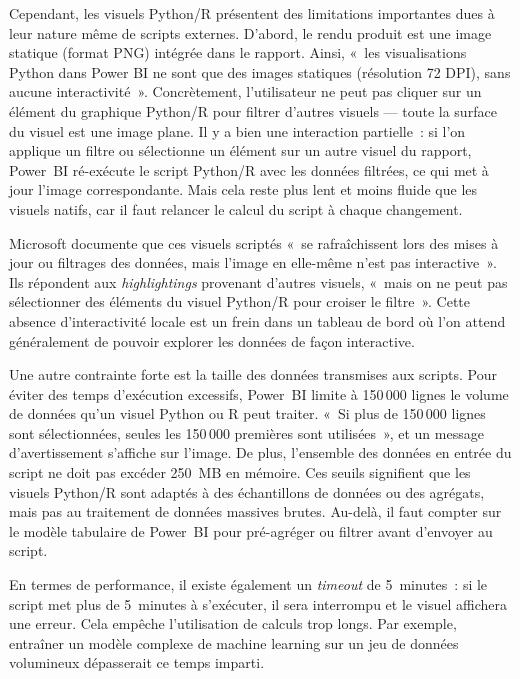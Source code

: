 Cependant, les visuels Python/R présentent des limitations importantes dues à leur nature même de scripts externes.  
D’abord, le rendu produit est une image statique (format PNG) intégrée dans le rapport.  
Ainsi, «~les visualisations Python dans Power BI ne sont que des images statiques (résolution 72 DPI), sans aucune interactivité~»\parencite{RealPythonPowerBI2023}.  
Concrètement, l’utilisateur ne peut pas cliquer sur un élément du graphique Python/R pour filtrer d’autres visuels — toute la surface du visuel est une image plane.  
Il y a bien une interaction partielle~: si l’on applique un filtre ou sélectionne un élément sur un autre visuel du rapport, Power~BI ré-exécute le script Python/R avec les données filtrées, ce qui met à jour l’image correspondante\parencite{RealPythonPowerBI2023}.  
Mais cela reste plus lent et moins fluide que les visuels natifs, car il faut relancer le calcul du script à chaque changement.

Microsoft documente que ces visuels scriptés «~se rafraîchissent lors des mises à jour ou filtrages des données, mais l’image en elle-même n’est pas interactive~»\parencite{MicrosoftPythonRVisualsDocs2024}.  
Ils répondent aux \textit{highlightings} provenant d’autres visuels, «~mais on ne peut pas sélectionner des éléments du visuel Python/R pour croiser le filtre~»\parencite{MicrosoftPythonRVisualsDocs2024}.  
Cette absence d’interactivité locale est un frein dans un tableau de bord où l’on attend généralement de pouvoir explorer les données de façon interactive.

Une autre contrainte forte est la taille des données transmises aux scripts.  
Pour éviter des temps d’exécution excessifs, Power~BI limite à 150\,000 lignes le volume de données qu’un visuel Python ou R peut traiter.  
«~Si plus de 150\,000 lignes sont sélectionnées, seules les 150\,000 premières sont utilisées~», et un message d’avertissement s’affiche sur l’image\parencite{MicrosoftPythonRVisualsDocs2024}.  
De plus, l’ensemble des données en entrée du script ne doit pas excéder 250~MB en mémoire\parencite{MicrosoftPythonRVisualsDocs2024}.  
Ces seuils signifient que les visuels Python/R sont adaptés à des échantillons de données ou des agrégats, mais pas au traitement de données massives brutes.  
Au-delà, il faut compter sur le modèle tabulaire de Power~BI pour pré-agréger ou filtrer avant d’envoyer au script.

En termes de performance, il existe également un \textit{timeout} de 5~minutes~: si le script met plus de 5~minutes à s’exécuter, il sera interrompu et le visuel affichera une erreur\parencite{MicrosoftPythonRVisualsDocs2024}.  
Cela empêche l’utilisation de calculs trop longs.  
Par exemple, entraîner un modèle complexe de machine learning sur un jeu de données volumineux dépasserait ce temps imparti.

